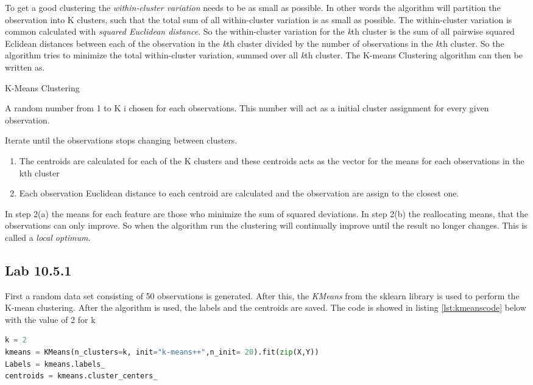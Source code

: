 To get a good clustering the \emph{within-cluster variation} needs to be as small as possible. In other words the algorithm will partition the observation into K clusters, such that the total sum of all within-cluster variation is as small as possible. The within-cluster variation is common calculated with \emph{squared Euclidean distance}.
So the within-cluster variation for the \emph{k}th cluster is the sum of all pairwise squared Eclidean distances between each of the observation in the \emph{k}th cluster divided by the number of observations in the \emph{k}th cluster.
So the algorithm tries to minimize the total within-cluster variation, summed over all \emph{k}th cluster.
The K-means Clustering algorithm can then be written as.

\begin{algorithm}
	\caption{K-Means Clustering}
	\label{algo:KMeansClustering}
	\begin{algorithmic}[1]
		\State A random number from 1 to K i chosen for each observations. This number will act as a initial cluster assignment for every given observation.
		
		\State 
		Iterate until the observations stops changing between clusters.
		\begin{enumerate}[label=(\alph*)]
			\item The centroids are calculated for each of the K clusters and these centroids acts as the vector for the means for each observations in the kth cluster
			
			\item Each observation Euclidean distance to  each centroid are calculated and the  observation are assign to the closest one.
		\end{enumerate}
	\end{algorithmic}
\end{algorithm}

 In step 2(a) the means for each feature are those who minimize the sum of squared deviations. In step 2(b) the reallocating means, that the observations can only improve.
 So when the algorithm run the clustering will continually improve until the result no longer changes. This is called a \emph{local optimum}.
\subsection{Lab 10.5.1}
First a random data set consisting of 50 observations is generated. After this, the \emph{KMeans} from the sklearn library is used to perform the K-mean clustering.
After the algorithm is used, the labels and the centroids are saved. The code is showed in listing \ref{lst:kmeanscode} below with the value of 2 for k
\begin{lstlisting}[language=Python, label=lst:kmeanscode, caption=The KMean function and the code who saved the labels and centroids]
k = 2
kmeans = KMeans(n_clusters=k, init="k-means++",n_init= 20).fit(zip(X,Y))
Labels = kmeans.labels_
centroids = kmeans.cluster_centers_
\end{lstlisting}

